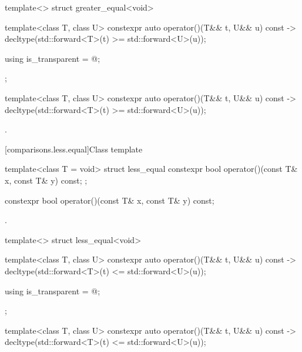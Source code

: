 %
\begin{itemdecl}
template<> struct greater_equal<void> {
  template<class T, class U> constexpr auto operator()(T&& t, U&& u) const
    -> decltype(std::forward<T>(t) >= std::forward<U>(u));

  using is_transparent = @\unspec@;
};
\end{itemdecl}

%
\begin{itemdecl}
template<class T, class U> constexpr auto operator()(T&& t, U&& u) const
  -> decltype(std::forward<T>(t) >= std::forward<U>(u));
\end{itemdecl}

\begin{itemdescr}
\pnum
\returns
{}.
\end{itemdescr}

[comparisons.less.equal]{Class template }

%
\begin{itemdecl}
template<class T = void> struct less_equal {
  constexpr bool operator()(const T& x, const T& y) const;
};
\end{itemdecl}

%
\begin{itemdecl}
constexpr bool operator()(const T& x, const T& y) const;
\end{itemdecl}

\begin{itemdescr}
\pnum
\returns
{}.
\end{itemdescr}

%
\begin{itemdecl}
template<> struct less_equal<void> {
  template<class T, class U> constexpr auto operator()(T&& t, U&& u) const
    -> decltype(std::forward<T>(t) <= std::forward<U>(u));

  using is_transparent = @\unspec@;
};
\end{itemdecl}

%
\begin{itemdecl}
template<class T, class U> constexpr auto operator()(T&& t, U&& u) const
  -> decltype(std::forward<T>(t) <= std::forward<U>(u));
\end{itemdecl}

